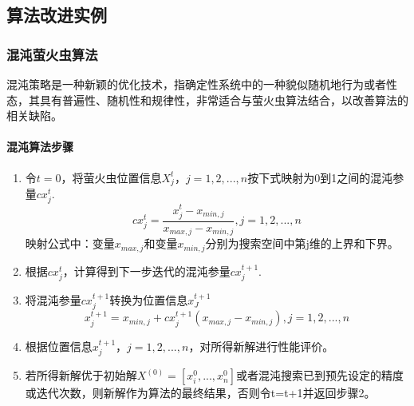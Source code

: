 \documentclass[UTF8]{ctexart}
\begin{document}
		\subsection{算法改进实例}
			\subsubsection{混沌萤火虫算法}
				混沌策略是一种新颖的优化技术，指确定性系统中的一种貌似随机地行为或者性态，其具有普遍性、随机性和规律性，非常适合与萤火虫算法结合，以改善算法的相关缺陷。
				\paragraph{混沌算法步骤}
					\begin{enumerate}
						\item 令$t=0$，将萤火虫位置信息$X_j^t$，$j=1,2,...,n$按下式映射为0到1之间的混沌参量$cx_j^t$.
								$$cx_j^t=\frac{x_j^t-x_{min,j}}{x_{max,j}-x_{min,j}}, j=1,2,...,n$$
							映射公式中：变量$x_{max,j}$和变量$x_{min,j}$分别为搜索空间中第j维的上界和下界。
						\item 根据$cx_j^t$，计算得到下一步迭代的混沌参量$cx_j^{t+1}$.
						\item 将混沌参量$cx_j^{t+1}$转换为位置信息$x_J^{t+1}$
								$$x_j^{t+1}=x_{min,j}+cx_j^{t+1}(x_{max,j}-x_{min,j}),j=1,2,...,n$$
						\item 根据位置信息$x_j^{t+1}$，$j=1,2,...,n$，对所得新解进行性能评价。
						\item 若所得新解优于初始解$X^{(0)}=[x_i^0,...,x_n^0]$或者混沌搜索已到预先设定的精度或迭代次数，则新解作为算法的最终结果，否则令t=t+1并返回步骤2。
					\end{enumerate}
\end{document}
